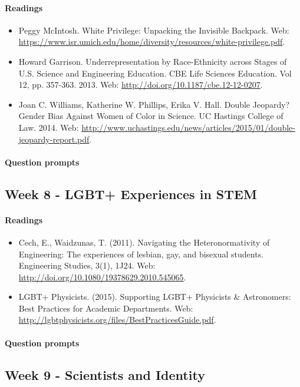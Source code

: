 \documentclass{article}
\begin{document}
\paragraph{Readings}
\begin{itemize}
\item Peggy McIntosh. White Privilege: Unpacking the Invisible Backpack. Web: \url{https://www.isr.umich.edu/home/diversity/resources/white-privilege.pdf}.
\item Howard Garrison. Underrepresentation by Race-Ethnicity across Stages of U.S. Science and Engineering Education. CBE Life Sciences Education. Vol 12, pp. 357-363. 2013. Web: \url{http://doi.org/10.1187/cbe.12-12-0207}.
\item Joan C. Williams, Katherine W. Phillips, Erika V. Hall. Double Jeopardy? Gender Bias Against Women of Color in Science. UC Hastings College of Law. 2014. Web: \url{http://www.uchastings.edu/news/articles/2015/01/double-jeopardy-report.pdf}.
\end{itemize}
\paragraph{Question prompts}

\subsection{Week 8 - LGBT+ Experiences in STEM}
\paragraph{Readings}
\begin{itemize}
\item Cech, E., Waidzunas, T. (2011). Navigating the Heteronormativity of Engineering: The  experiences of lesbian, gay, and bisexual students. Engineering Studies, 3(1), 1J24. Web: \url{http://doi.org/10.1080/19378629.2010.545065}.
\item LGBT+ Physicists. (2015). Supporting LGBT+ Physicists \& Astronomers: Best Practices for Academic Departments. Web: \url{http://lgbtphysicists.org/files/BestPracticesGuide.pdf}.
\end{itemize}
\paragraph{Question prompts}

\subsection{Week 9 - Scientists and Identity}
\end{document}
